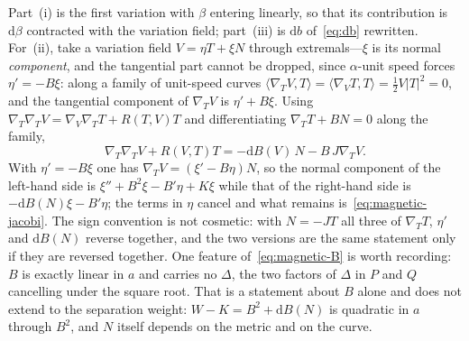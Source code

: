 \documentclass[12pt]{iopart}
\theoremstyle{plain}
\theoremstyle{definition}
\theoremstyle{remark}
\newcommand{\dd}{\mathrm{d}}
\begin{document}
Part~(i) is the first variation with $\beta$ entering linearly, so that its
contribution is $\dd\beta$ contracted with the variation field; part~(iii) is
$\dd b$ of~\eqref{eq:db} rewritten. For~(ii), take a variation field
$V=\eta T+\xi N$ through extremals---$\xi$ is its normal \emph{component}, and
the tangential part cannot be dropped, since $\alpha$-unit speed forces
$\eta'=-B\xi$: along a family of unit-speed curves
$\langle\nabla_TV,T\rangle=\langle\nabla_VT,T\rangle=\tfrac12V|T|^2=0$, and the tangential
component of $\nabla_TV$ is $\eta'+B\xi$. Using $\nabla_T\nabla_TV=\nabla_V\nabla_TT+R(T,V)T$ and
differentiating $\nabla_TT+BN=0$ along the family,
\begin{equation}
    \nabla_T\nabla_TV+R(V,T)T=-\dd B(V)\,N-B\,J\nabla_TV .
    \label{eq:magnetic-variation}
\end{equation}
With $\eta'=-B\xi$ one has $\nabla_TV=(\xi'-B\eta)N$, so the normal component of
the left-hand side is $\xi''+B^2\xi-B'\eta+K\xi$ while that of the right-hand
side is $-\dd B(N)\xi-B'\eta$; the terms in $\eta$ cancel and what remains
is~\eqref{eq:magnetic-jacobi}. The sign convention is not cosmetic: with
$N=-JT$ all three of $\nabla_TT$, $\eta'$ and $\dd B(N)$ reverse together, and
the two versions are the same statement only if they are reversed together. One
feature of~\eqref{eq:magnetic-B} is worth recording: $B$ is exactly linear in $a$
and carries no $\Delta$, the two factors of $\Delta$ in $P$ and $Q$ cancelling
under the square root. That is a statement about $B$ alone and does not extend to
the separation weight: $W-K=B^2+\dd B(N)$ is quadratic in $a$ through $B^2$, and
$N$ itself depends on the metric and on the curve.
\end{document}
